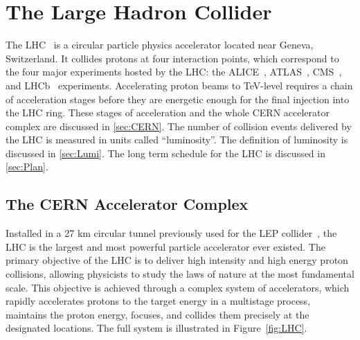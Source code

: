\chapter{The Large Hadron Collider}
\label{chap:LHC}

The \ac{LHC}~\cite{Evans:2008zzb} is a circular particle physics accelerator located near Geneva, Switzerland. It collides protons at four interaction points, which correspond to the four major experiments hosted by the \ac{LHC}: the \ac{ALICE}~\cite{ALICE:2008ngc}, \ac{ATLAS}~\cite{ATLAS:2008xda}, \ac{CMS}~\cite{CMS:2008xjf}, and \ac{LHCb}~\cite{LHCb:2008vvz} experiments. Accelerating proton beams to TeV-level requires a chain of acceleration stages before they are energetic enough for the final injection into the \ac{LHC} ring. These stages of acceleration and the whole \ac{CERN} accelerator complex are discussed in \autoref{sec:CERN}. The number of collision events delivered by the \ac{LHC} is measured in units called ``luminosity''. The definition of luminosity is discussed in \autoref{sec:Lumi}. The long term schedule for the \ac{LHC} is discussed in \autoref{sec:Plan}.

\section{The CERN Accelerator Complex}
\label{sec:CERN}

Installed in a 27 km circular tunnel previously used for the \ac{LEP} collider~\cite{203828}, the \ac{LHC} is the largest and most powerful particle accelerator ever existed. The primary objective of the \ac{LHC} is to deliver high intensity and high energy proton collisions, allowing physicists to study the laws of nature at the most fundamental scale. This objective is achieved through a complex system of accelerators, which rapidly accelerates protons to the target energy in a multistage process, maintains the proton energy, focuses, and collides them precisely at the designated locations. The full system is illustrated in Figure~\ref{fig:LHC}.

